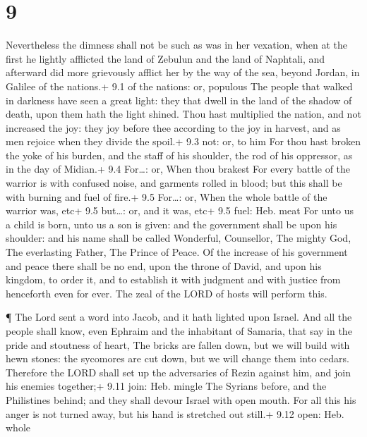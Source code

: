 \hypertarget{section-8}{%
\section{9}\label{section-8}}

 Nevertheless the dimness shall not be such as was in her
vexation, when at the first he lightly afflicted the land of Zebulun and
the land of Naphtali, and afterward did more grievously afflict her by
the way of the sea, beyond Jordan, in Galilee of the nations.+ 9.1 of
the nations: or, populous  The people that walked in
darkness have seen a great light: they that dwell in the land of the
shadow of death, upon them hath the light shined.  Thou hast
multiplied the nation, and not increased the joy: they joy before thee
according to the joy in harvest, and as men rejoice when they divide the
spoil.+ 9.3 not: or, to him  For thou hast broken the yoke
of his burden, and the staff of his shoulder, the rod of his oppressor,
as in the day of Midian.+ 9.4 For\ldots: or, When thou brakest
 For every battle of the warrior is with confused noise, and
garments rolled in blood; but this shall be with burning and fuel of
fire.+ 9.5 For\ldots: or, When the whole battle of the warrior was, etc+
9.5 but\ldots: or, and it was, etc+ 9.5 fuel: Heb. meat  For
unto us a child is born, unto us a son is given: and the government
shall be upon his shoulder: and his name shall be called Wonderful,
Counsellor, The mighty God, The everlasting Father, The Prince of Peace.
 Of the increase of his government and peace there shall be
no end, upon the throne of David, and upon his kingdom, to order it, and
to establish it with judgment and with justice from henceforth even for
ever. The zeal of the LORD of hosts will perform this.

 ¶ The Lord sent a word into Jacob, and it hath lighted upon
Israel.  And all the people shall know, even Ephraim and the
inhabitant of Samaria, that say in the pride and stoutness of heart,
 The bricks are fallen down, but we will build with hewn
stones: the sycomores are cut down, but we will change them into cedars.
 Therefore the LORD shall set up the adversaries of Rezin
against him, and join his enemies together;+ 9.11 join: Heb. mingle
 The Syrians before, and the Philistines behind; and they
shall devour Israel with open mouth. For all this his anger is not
turned away, but his hand is stretched out still.+ 9.12 open: Heb. whole

